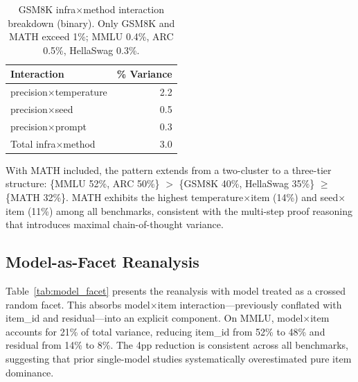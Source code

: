 \documentclass[11pt,twocolumn]{article}
\begin{document}
\begin{table}[t]
\centering
\caption{GSM8K infra$\times$method interaction breakdown (binary). Only GSM8K and MATH exceed 1\%; MMLU 0.4\%, ARC 0.5\%, HellaSwag 0.3\%.}
\label{tab:gsm8k_infra}
\small
\begin{tabular}{@{}lr@{}}
\toprule
Interaction & \% Variance \\
\midrule
precision$\times$temperature & 2.2 \\
precision$\times$seed & 0.5 \\
precision$\times$prompt & 0.3 \\
\midrule
Total infra$\times$method & 3.0 \\
\bottomrule
\end{tabular}
\end{table}

With MATH included, the pattern extends from a two-cluster to a three-tier structure: \{MMLU 52\%, ARC 50\%\} $>$ \{GSM8K 40\%, HellaSwag 35\%\} $\geq$ \{MATH 32\%\}. MATH exhibits the highest temperature$\times$item (14\%) and seed$\times$item (11\%) among all benchmarks, consistent with the multi-step proof reasoning that introduces maximal chain-of-thought variance.

\subsection{Model-as-Facet Reanalysis}
\label{sec:modelasfacet}

Table~\ref{tab:model_facet} presents the reanalysis with model treated as a crossed random facet. This absorbs model$\times$item interaction---previously conflated with item\_id and residual---into an explicit component. On MMLU, model$\times$item accounts for 21\% of total variance, reducing item\_id from 52\% to 48\% and residual from 14\% to 8\%. The 4pp reduction is consistent across all benchmarks, suggesting that prior single-model studies systematically overestimated pure item dominance.
\end{document}
